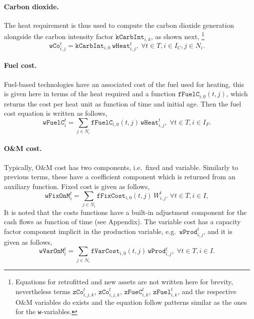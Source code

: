 \documentclass{amsart}
\begin{document}
%
\paragraph{Carbon dioxide.}
The heat requirement is thus used to compute the carbon dioxide generation
alongside the carbon intensity factor $\mathtt{kCarbInt}_{i,k}$, as shown next,
\footnote{Equations for retrofitted and new assets are not written here for
brevity, nevertheless terms $\mathtt{zCo}^t_{i,j,k}$, $\mathtt{zCo}^t_{i,j,k}$, 
$\mathtt{zFueC}^t_{i,k}$, $\mathtt{zFuel}^t_{i,k}$, and the respective O\&M
variables do exists and the equation follow patterns similar as the ones for the
\texttt{w}-variables.} 
%
\begin{equation}
    \mathtt{wCo}^t_{i,j} = \mathtt{kCarbInt}_{i,0}\
    \mathtt{wHeat}^t_{i,j},
    \; \forall t \in T, i \in I_C, j \in N_i.
\end{equation}
%
\paragraph{Fuel cost.}
Fuel-based technologies have an associated cost of the fuel used for heating,
this is given here in terms of the heat required and a function
$\mathtt{fFuelC}_{i,0}\! \left(t,j\right)$, which returns the cost per heat unit
as function of time and initial age. Then the fuel cost equation is written as
follows,
%
\begin{equation}
    \mathtt{wFuelC}^t_{i} = \sum_{j\in N_i}
    \mathtt{fFuelC}_{i,0}\! \left(t,j\right)\,
    \mathtt{wHeat}^t_{i,j},
    \; \forall t \in T, i \in I_F. 
\end{equation}
%
\paragraph{O\&M cost.}
%
Typically, O\&M cost has two components, i.e.\ fixed and variable. Similarly to
previous terms, these have a coefficient component which is returned from an
auxiliary function. Fixed cost is given as follows, 
\begin{equation}
    \mathtt{wFixOnM}^t_i = \sum_{j\in N_i} 
    \mathtt{fFixCost}_{i,0}\! \left(t,j\right)\,
    W^t_{i,j}.
    \; \forall t \in T, i \in I, 
\end{equation}
It is noted that the costs functions have a built-in adjustment component for
the cash flows as function of time (see Appendix).
%
The variable cost has a capacity factor component implicit in the production
variable, e.g.\ $\mathtt{wProd}^t_{i,j}$, and it is given as follows,
%
\begin{equation}
    \mathtt{wVarOnM}^t_{i} = \sum_{j\in N_i}
    \mathtt{fVarCost}_{i,0}\! \left(t,j\right)\,
    \mathtt{wProd}^t_{i,j},
    \; \forall t \in T, i \in I.
\end{equation}
%
\end{document}
